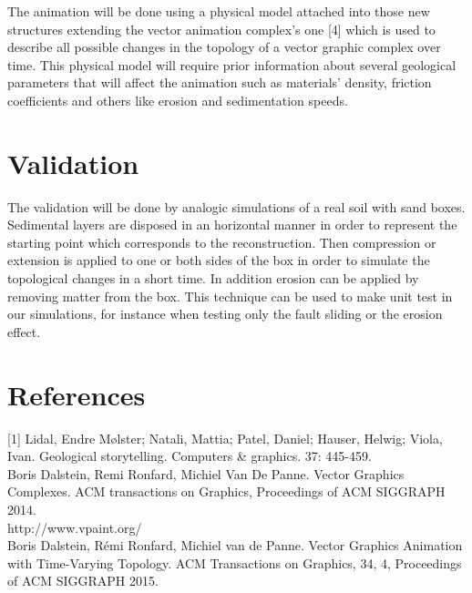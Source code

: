 \documentclass[a4paper,11pt]{article}
\begin{document}
The animation will be done using a physical model attached into those new structures extending the vector animation complex's one [4] which is used to describe all possible changes in the topology of a vector graphic complex over time.
This physical model will require prior information about several geological parameters that will affect the animation such as materials' density, friction coefficients and others like erosion and sedimentation speeds.


\section{Validation}

The validation will be done by analogic simulations of a real soil with sand boxes. Sedimental layers are disposed in an horizontal manner in order to represent the starting point which corresponds to the reconstruction. Then compression or extension is applied to one or both sides of the box in order to simulate the topological changes in a short time. In addition erosion can be applied by  removing matter from the box. This technique can be used to make unit test in our simulations, for instance when testing only the fault sliding or the erosion effect.

\section{References}

[1] Lidal, Endre Mølster; Natali, Mattia; Patel, Daniel; Hauser, Helwig; Viola, Ivan.
Geological storytelling. Computers \& graphics. 37: 445-459.\\

\noindent[2] Boris Dalstein, Remi Ronfard, Michiel Van De Panne. Vector Graphics Complexes. ACM transactions on
Graphics, Proceedings of ACM SIGGRAPH 2014.\\

\noindent[3] http://www.vpaint.org/ \\

\noindent[4] Boris Dalstein, Rémi Ronfard, Michiel van de Panne. Vector Graphics Animation with Time-Varying Topology.
ACM Transactions on Graphics, 34, 4, Proceedings of ACM SIGGRAPH 2015.
\end{document}

